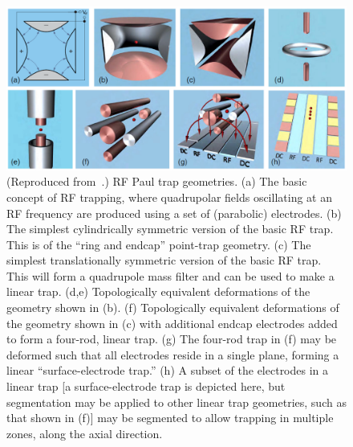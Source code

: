 \documentclass[%
reprint,
 amsmath,amssymb,
]{revtex4-1}
\begin{document}
\begin{figure}[t b h]
\includegraphics[width=2.0\columnwidth]{traps_from_brownnutt.PNG}
\caption{(Reproduced from~\cite{brownnutt_2015}.) RF Paul trap geometries. (a) The basic concept of RF trapping, where quadrupolar fields oscillating at an RF frequency are produced using a set of (parabolic) electrodes.  (b) The simplest cylindrically symmetric version of the basic RF trap.  This is of the ``ring and endcap'' point-trap geometry.  (c) The simplest translationally symmetric version of the basic RF trap.  This will form a quadrupole mass filter and can be used to make a linear trap.  (d,e) Topologically equivalent deformations of the geometry shown in (b).  (f) Topologically equivalent deformations of the geometry shown in (c) with additional endcap electrodes added to form a four-rod, linear trap.  (g) The four-rod trap in (f) may be deformed such that all electrodes reside in a single plane, forming a linear ``surface-electrode trap.''  (h) A subset of the electrodes in a linear trap [a surface-electrode trap is depicted here, but segmentation may be applied to other linear trap geometries, such as that shown in (f)] may be segmented to allow trapping in multiple zones, along the axial direction.}
\label{fig:rf_trap_types}
\end{figure}
\end{document}
